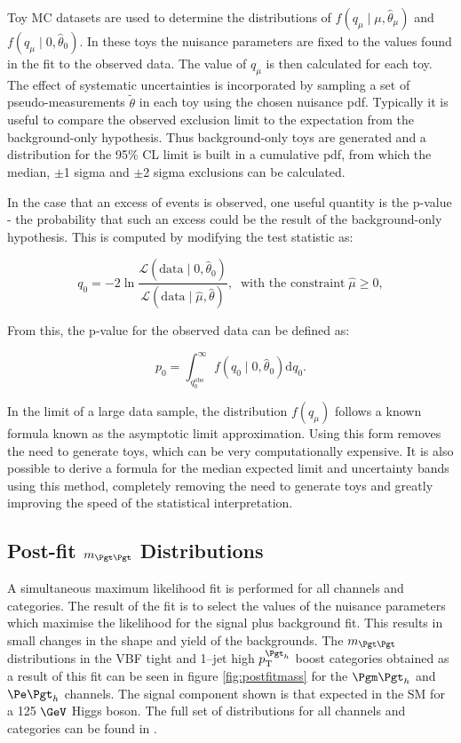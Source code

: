 Toy \ac{MC} datasets are used to determine the distributions of 
$f(q_{\mu}\mid\mu,\hat{\theta}_{\mu})$ and $f(q_{\mu}\mid0,\hat{\theta}_{0})$.
In these toys the nuisance parameters are
fixed to the values found in the fit to the observed data. The value of
$q_{\mu}$ is then calculated for each toy. The effect of systematic
uncertainties is incorporated by sampling a set of pseudo-measurements
$\tilde{\theta}$ in each toy using the chosen nuisance \ac{pdf}.
Typically it is useful to compare the observed exclusion limit to the expectation 
from the background-only hypothesis. Thus background-only toys are generated and
a distribution for the 95\% CL limit is built in a cumulative \ac{pdf}, from
which the median, $\pm$1 sigma and $\pm$2 sigma exclusions can be calculated.

In the case that an excess of events is observed, one useful quantity is the
p-value - the probability that such an excess could be the result of the
background-only hypothesis. This is computed by modifying the test statistic as:

\begin{equation}
q_{0} = -2
\ln\frac{\mathcal{L}(\mathrm{data}\mid0,\hat{\theta}_{0})}{\mathcal{L}(\mathrm{data}\mid\hat{\mu},\hat{\theta})},
\;\; \text{with the constraint} \; \hat{\mu}\geq 0,
\end{equation}

From this, the p-value for the observed data can be defined as:

\begin{equation}
p_{0} =
\int_{q_{0}^{\mathrm{obs}}}^{\infty}f(q_{0}\mid0,\hat{\theta}_{0})\mathrm{d}q_{0}
.
\end{equation}

In the limit of a large data sample, the distribution $f(q_{\mu})$ follows a known formula
\cite{Cowan:2011aa} known as the asymptotic limit approximation. Using this form
removes the need to generate toys, which can be very computationally expensive.
It is also possible to derive a formula for
the median expected limit and uncertainty bands using this method, completely
removing the need to generate toys and greatly improving the speed of the
statistical interpretation.

\subsection{Post-fit $m_{\Pgt\Pgt}$ Distributions}

A simultaneous maximum likelihood fit is performed for all channels and
categories. The result of the fit is to select the values of the nuisance
parameters which maximise the likelihood for the signal plus background fit.
This results in small changes in the shape and yield of the backgrounds. The
$m_{\Pgt\Pgt}$ distributions in the VBF tight and 1--jet high $\pt^{\Pgt_{h}}$
boost categories obtained as a result of this fit can be seen in
figure \ref{fig:postfitmass} for the $\mutau$ and $\etau$ channels. The signal
component shown is that expected in the \ac{SM} for a 125 $\GeV$ Higgs boson. The full set
of distributions for all channels and categories can be found in
\cite{HIG-13-004}.

